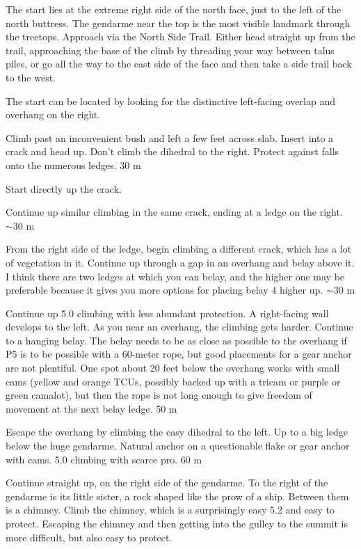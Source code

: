 \documentclass{tahquitz}
\begin{document}
The start lies at  the extreme right side of the north face, just to
the left of the north buttress. The gendarme near the top is the most
visible landmark through the treetops. Approach via the North Side Trail.
Either head straight up from the trail, approaching the base of the climb by threading your
way between talus piles, or go all the way to the east side of the face
and then take a side trail back to the west.

The start can be located by looking for the distinctive left-facing
overlap and overhang on the right.

\somespace

 Climb past an inconvenient bush and left a few feet across slab.
Insert into a crack and head up. Don't climb the dihedral to the right. 
Protect against falls onto the numerous ledges.
30 m

 Start directly up the crack.

 Continue up similar climbing in the same crack,
ending at a ledge on the right.  $\sim 30$ m

 From the right side of the ledge, begin climbing a
different crack, which has a lot of vegetation in it.
Continue up through a gap in an overhang and belay above it.
I think there are two ledges at which you can belay, and the higher one
may be preferable because it gives you more options for placing belay
4 higher up. $\sim 30$ m

 Continue up 5.0 climbing with less abundant protection.  A
right-facing wall develops to the left.  As you near an overhang, the
climbing gets harder.  Continue to a hanging belay. The belay needs to
be as close as possible to the overhang if P5 is to be possible with a
60-meter rope, but good placements for a gear anchor are not
plentiful. One spot about 20 feet below the overhang works with small
cams (yellow and orange TCUs, possibly backed up with a tricam or
purple or green camalot), but then the rope is not long enough to give
freedom of movement at the next belay ledge. 50 m

 Escape the overhang by climbing the easy dihedral to the left.
Up to a big ledge below the huge gendarme. Natural anchor on a questionable
flake or gear anchor with cams. 5.0 climbing with scarce pro.
60 m

 Continue straight up, on the right side of the gendarme.  To
the right of the gendarme is its little sister, a rock shaped like the
prow of a ship. Between them is a chimney. Climb the chimney, which is
a surprisingly easy 5.2 and easy to protect. Escaping the chimney and
then getting into the gulley to the summit is more difficult, but also
easy to protect.
\end{document}
